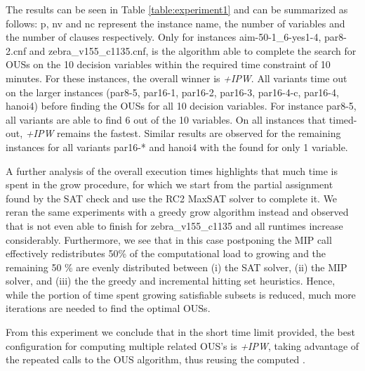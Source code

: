 The results can be seen in Table \ref{table:experiment1} and can be summarized as follows: p, nv and nc represent the instance name, the number of variables and the number of clauses respectively. 
Only for instances aim-50-1\_6-yes1-4, par8-2.cnf and zebra\_v155\_c1135.cnf, is the algorithm able to complete the search for OUSs on the 10 decision variables within the required time constraint of 10 minutes.
For these instances, the overall winner is \emph{{\omus}+IPW}. 
All variants time out on the larger instances (par8-5, par16-1, par16-2, par16-3, par16-4-c, par16-4, hanoi4) before finding the OUSs for all 10 decision variables. For instance par8-5, all variants are able to find 6 out of the 10 variables. On all instances that timed-out, \emph{{\omus}+IPW} remains the fastest. Similar results are observed for the remaining instances for all variants par16-* and hanoi4 with the \omus found for only 1 variable.


A further analysis of the overall execution times highlights that much time is spent in the grow procedure, for which we start from the partial assignment found by the SAT check and use the RC2 MaxSAT solver to complete it. 
We reran the same experiments with a greedy grow algorithm instead and observed that \omus is not even able to finish for zebra\_v155\_c1135 and all runtimes increase considerably.
Furthermore, we see that in this case postponing the MIP call effectively redistributes 50\% of the computational load to growing \satsets and the remaining 50 \% are evenly distributed between (i) the SAT solver, (ii) the MIP solver, and (iii) the the greedy and incremental hitting set heuristics. Hence, while the portion of time spent growing satisfiable subsets is reduced, much more iterations are needed to find the optimal OUSs. %

From this experiment we conclude that in the short time limit provided, the best configuration for computing multiple related OUS's is \emph{{\omus}+IPW}, taking advantage of the repeated calls to the OUS algorithm, thus reusing the computed \satsets.

